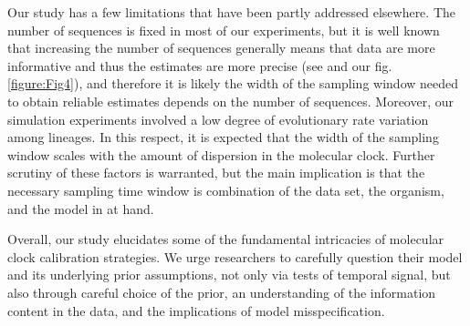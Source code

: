 \documentclass[11pt]{article}
\begin{document}
Our study has a few limitations that have been partly addressed elsewhere. The number of sequences is fixed in most of our experiments, but it is well known that increasing the number of sequences generally means that data are more informative and thus the estimates are more precise (see \cite{moller2018impact} and our fig. \ref{figure:Fig4}), and therefore it is likely the width of the sampling window needed to obtain reliable estimates depends on the number of sequences. Moreover, our simulation experiments involved a low degree of evolutionary rate variation among lineages. In this respect, it is expected that the width of the sampling window scales with the amount of dispersion in the molecular clock. Further scrutiny of these factors is warranted, but the main implication is that the necessary sampling time window is combination of the data set, the organism, and the model in at hand. 

Overall, our study elucidates some of the fundamental intricacies of molecular clock calibration strategies. We urge researchers to carefully question their model and its underlying prior assumptions, not only via tests of temporal signal, but also through careful choice of the prior, an understanding of the information content in the data, and the implications of model misspecification.
\end{document}
